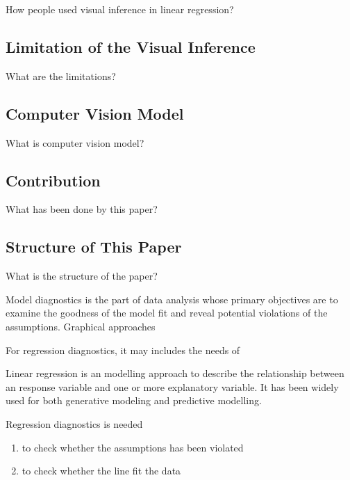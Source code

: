 \documentclass{monashthesis}
\theoremstyle{definition}
\theoremstyle{definition}
\theoremstyle{definition}
\theoremstyle{definition}
\theoremstyle{remark}
\begin{document}
How people used visual inference in linear regression?

\hypertarget{limitation-of-the-visual-inference}{%
\subsection{Limitation of the Visual Inference}\label{limitation-of-the-visual-inference}}

What are the limitations?

\hypertarget{computer-vision-model}{%
\subsection{Computer Vision Model}\label{computer-vision-model}}

What is computer vision model?

\hypertarget{contribution}{%
\subsection{Contribution}\label{contribution}}

What has been done by this paper?

\hypertarget{structure-of-this-paper}{%
\subsection{Structure of This Paper}\label{structure-of-this-paper}}

What is the structure of the paper?

Model diagnostics is the part of data analysis whose primary objectives are to examine the goodness of the model fit and reveal potential violations of the assumptions. Graphical approaches

For regression diagnostics, it may includes the needs of

Linear regression is an modelling approach to describe the relationship between an response variable and one or more explanatory variable. It has been widely used for both generative modeling and predictive modelling.

Regression diagnostics is needed

\begin{enumerate}
\def\labelenumi{\arabic{enumi}.}
\tightlist
\item
  to check whether the assumptions has been violated
\item
  to check whether the line fit the data
\end{enumerate}
\end{document}
